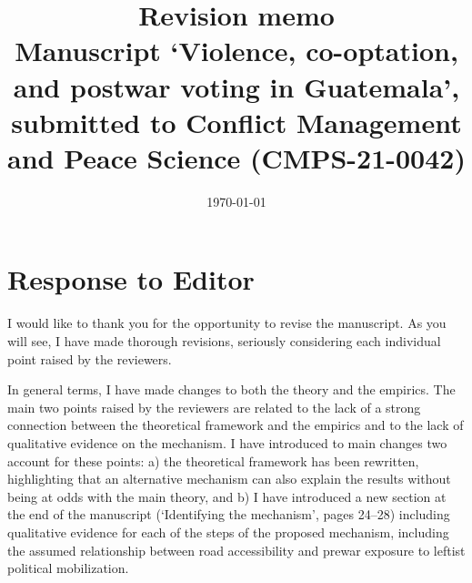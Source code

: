 \documentclass[12pt, a4paper, notitlepage]{article}
\title{\Large \textbf{Revision memo}\\{\large Manuscript `Violence, co-optation, and postwar voting in Guatemala', submitted to Conflict Management and Peace Science (CMPS-21-0042)}}
\author{}
\date{\today}
\begin{document}
\maketitle

\section*{Response to Editor}


I would like to thank you for the opportunity to revise the manuscript. As you will see, I have made thorough revisions, seriously considering each individual point raised by the reviewers.

In general terms, I have made changes to both the theory and the empirics. The main two points raised by the reviewers are related to the lack of a strong connection between the theoretical framework and the empirics and to the lack of qualitative evidence on the mechanism. I have introduced to main changes two account for these points: a) the theoretical framework has been rewritten, highlighting that an alternative mechanism can also explain the results without being at odds with the main theory, and b) I have introduced a new section at the end of the manuscript (`Identifying the mechanism', pages 24--28) including qualitative evidence for each of the steps of the proposed mechanism, including the assumed relationship between road accessibility and prewar exposure to leftist political mobilization.
\end{document}
